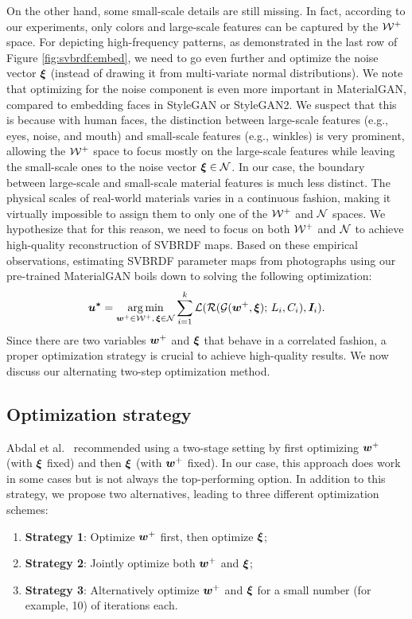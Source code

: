 

On the other hand, some small-scale details are still missing.
In fact, according to our experiments, only colors and large-scale features can be captured by the $\mathcal{W}^+$ space.
For depicting high-frequency patterns, as demonstrated in the last row of Figure \ref{fig:svbrdf:embed}, we need to go even further and optimize the noise vector $\bm{\xi}$ (instead of drawing it from multi-variate normal distributions).
We note that optimizing for the noise component is even more important in MaterialGAN, compared to embedding faces in StyleGAN or StyleGAN2.
We suspect that this is because with human faces, the distinction between large-scale features (e.g., eyes, noise, and mouth) and small-scale features (e.g., winkles) is very prominent, allowing the $\mathcal{W}^+$ space to focus mostly on the large-scale features while leaving the small-scale ones to the noise vector $\bm{\xi} \in \mathcal{N}$.
In our case, the boundary between large-scale and small-scale material features is much less distinct.
The physical scales of real-world materials varies in a continuous fashion, making it virtually impossible to assign them to only one of the $\mathcal{W}^+$ and $\mathcal{N}$ spaces.
We hypothesize that for this reason, we need to focus on both $\mathcal{W}^+$ and $\mathcal{N}$ to achieve high-quality reconstruction of SVBRDF maps.
Based on these empirical observations, estimating SVBRDF parameter maps from photographs using our pre-trained MaterialGAN boils down to solving the following optimization:
\begin{equation}
	\bm{u^{*}} = \operatorname*{arg\,min}_{\bm{w}^+ \in \mathcal{W}^+,\, \bm{\xi} \in \mathcal{N}} \sum_{i=1}^k \mathcal{L}(\mathcal{R}(\mathcal{G}(\bm{w}^+, \bm{\xi}); \,L_i, C_i), \bm{I}_i).
\end{equation}
Since there are two variables $\bm{w}^+$ and $\bm{\xi}$ that behave in a correlated fashion, a proper optimization strategy is crucial to achieve high-quality results. We now discuss our alternating two-step optimization method.

\subsection{Optimization strategy}
\label{ssec:optim}

Abdal et al.~\cite{abdal2019image2stylegan,abdal2020image2stylegan++} recommended using a two-stage setting by first optimizing $\bm{w}^+$ (with $\bm{\xi}$ fixed) and then $\bm{\xi}$ (with $\bm{w}^+$ fixed).
In our case, this approach does work in some cases but is not always the top-performing option.
In addition to this strategy, we propose two alternatives, leading to three different optimization schemes:
\begin{enumerate}
	\item \textbf{Strategy 1}: Optimize $\bm{w}^+$ first, then optimize $\bm{\xi}$;
	\item \textbf{Strategy 2}: Jointly optimize both $\bm{w}^+$ and $\bm{\xi}$;
	\item \textbf{Strategy 3}: Alternatively optimize $\bm{w}^+$ and $\bm{\xi}$ for a small number (for example, 10) of iterations each.
\end{enumerate}

